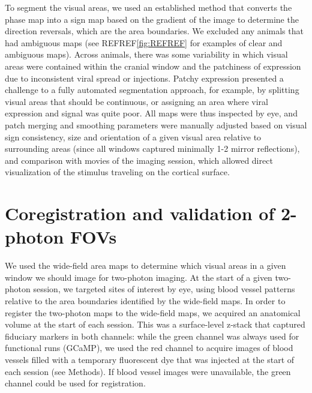To segment the visual areas, we used an established method that converts the phase map into a sign map based on the gradient of the image to determine the direction reversals, which are the area boundaries\cite{Garrett2014, Zhuang2017}. We excluded any animals that had ambiguous maps (see REFREF\ref{fig:REFREF} for examples of clear and ambiguous maps). Across animals, there was some variability in which visual areas were contained within the cranial window and the patchiness of expression due to inconsistent viral spread or injections. Patchy expression presented a challenge to a fully automated segmentation approach, for example, by splitting visual areas that should be continuous, or assigning an area where viral expression and signal was quite poor. All maps were thus inspected by eye, and patch merging and smoothing parameters were manually adjusted based on visual sign consistency, size and orientation of a given visual area relative to surrounding areas (since all windows captured minimally 1-2 mirror reflections), and comparison with movies of the imaging session, which allowed direct visualization of the stimulus traveling on the cortical surface. 

\section{Coregistration and validation of 2-photon FOVs}


We used the wide-field area maps to determine which visual areas in a given window we should image for two-photon imaging. At the start of a given two-photon session, we targeted sites of interest by eye, using blood vessel patterns relative to the area boundaries identified by the wide-field maps. In order to register the two-photon maps to the wide-field maps, we acquired an anatomical volume at the start of each session. This was a surface-level z-stack that captured fiduciary markers in both channels: while the green channel was always used for functional runs (GCaMP), we used the red channel to acquire images of blood vessels filled with a temporary fluorescent dye that was injected at the start of each session (see Methods). If blood vessel images were unavailable, the green channel could be used for registration. 

